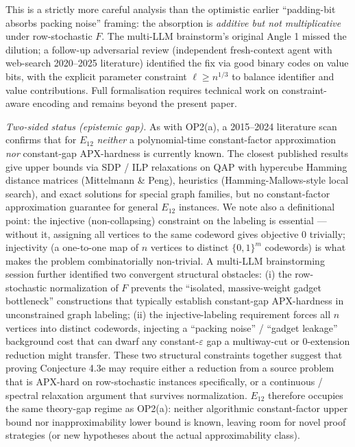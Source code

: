 \documentclass[
]{article}
\begin{document}
\begin{itemize}
  This is a strictly more careful analysis than the optimistic
  earlier ``padding-bit absorbs packing noise'' framing: the absorption
  is \emph{additive but not multiplicative} under row-stochastic $F$.
  The multi-LLM brainstorm's original Angle 1 missed the dilution; a
  follow-up adversarial review (independent fresh-context agent with
  web-search 2020--2025 literature) identified the fix via good
  binary codes on value bits, with the explicit parameter constraint
  $\ell \geq n^{1/3}$ to balance identifier and value contributions.
  Full formalisation requires technical work on constraint-aware
  encoding and remains beyond the present paper.

  \emph{Two-sided status (epistemic gap).} As with OP2(a), a 2015--2024
  literature scan confirms that for $E_{12}$ \emph{neither} a
  polynomial-time constant-factor approximation \emph{nor} constant-gap
  APX-hardness is currently known. The closest published results give
  upper bounds via SDP / ILP relaxations on QAP with hypercube Hamming
  distance matrices (Mittelmann \& Peng), heuristics
  (Hamming-Mallows-style local search), and exact solutions for special
  graph families, but no constant-factor approximation guarantee for
  general $E_{12}$ instances. We note also a definitional point: the
  injective (non-collapsing) constraint on the labeling is essential
  --- without it, assigning all vertices to the same codeword gives
  objective $0$ trivially; injectivity (a one-to-one map of $n$
  vertices to distinct $\{0,1\}^m$ codewords) is what makes the
  problem combinatorially non-trivial. A multi-LLM brainstorming
  session further identified two convergent structural obstacles:
  (i) the row-stochastic normalization of $F$ prevents the ``isolated,
  massive-weight gadget bottleneck'' constructions that typically
  establish constant-gap APX-hardness in unconstrained graph
  labeling; (ii) the injective-labeling requirement forces all $n$
  vertices into distinct codewords, injecting a ``packing noise''
  / ``gadget leakage'' background cost that can dwarf any
  constant-$\varepsilon$ gap a multiway-cut or 0-extension reduction
  might transfer. These two structural constraints together suggest
  that proving Conjecture 4.3e may require either a reduction from
  a source problem that is APX-hard on row-stochastic instances
  specifically, or a continuous / spectral relaxation argument that
  survives normalization. $E_{12}$ therefore occupies
  the same theory-gap regime as OP2(a): neither algorithmic
  constant-factor upper bound nor inapproximability lower bound is
  known, leaving room for novel proof strategies (or new hypotheses
  about the actual approximability class).


\end{itemize}
\end{document}
